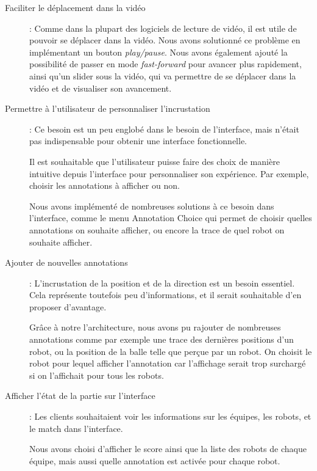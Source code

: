 \begin{description}
    \item[Faciliter le déplacement dans la vidéo]: Comme dans la
    plupart des logiciels de lecture de vidéo, il est utile de
    pouvoir se déplacer dans la vidéo. Nous avons solutionné ce
    problème en implémentant un bouton \textit{play/pause}. Nous
    avons également ajouté la possibilité de passer en mode 
    \textit{fast-forward} pour avancer plus rapidement, ainsi
    qu'un slider sous la vidéo, qui va permettre de se déplacer 
    dans la vidéo et de visualiser son avancement.
    \bigskip
    
    \item[Permettre à l'utilisateur de personnaliser 
    l'incrustation]: Ce besoin est un peu englobé dans le besoin 
    de l'interface, mais n'était pas indispensable pour obtenir 
    une interface fonctionnelle. 
    \bigskip
    
    Il est souhaitable que l'utilisateur puisse faire des choix 
    de manière intuitive depuis l'interface pour personnaliser 
    son expérience. Par exemple, choisir les annotations à 
    afficher ou non. 
    
    Nous avons implémenté de nombreuses solutions à ce besoin 
    dans l'interface, comme le menu Annotation Choice qui permet 
    de choisir quelles annotations on souhaite afficher, ou 
    encore la trace de quel robot on souhaite afficher.
    
    \item[Ajouter de nouvelles annotations]: L'incrustation de la
    position et de la direction est un besoin essentiel. Cela
    représente toutefois peu d'informations, et il serait 
    souhaitable d'en proposer d'avantage. 
    \bigskip
    
    Grâce à notre l'architecture, nous avons pu rajouter de 
    nombreuses annotations comme par exemple une trace des 
    dernières positions d'un robot, ou la position de la balle 
    telle que perçue par un robot. On choisit le robot pour 
    lequel afficher l'annotation car l'affichage serait trop 
    surchargé si on l'affichait pour tous les robots.
    \bigskip
    
    \item[Afficher l'état de la partie sur l'interface]: Les 
    clients souhaitaient voir les informations sur les équipes, 
    les robots, et le match dans l'interface. 
    \bigskip
    
    Nous avons choisi d'afficher le score ainsi que la liste des 
    robots de chaque équipe, mais aussi quelle annotation est 
    activée pour chaque robot.
\end{description}

